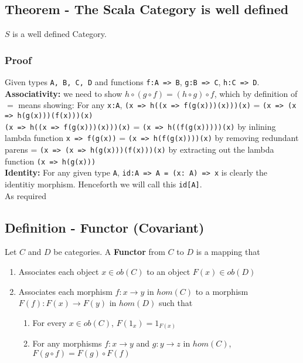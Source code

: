 \documentclass[9pt]{article} %
\begin{document}
\subsection{Theorem - The Scala Category is well defined}

$S$ is a well defined Category.

\subsubsection{Proof}

Given types \texttt{A, B, C, D} and functions \texttt{f:A => B}, \texttt{g:B => C}, \texttt{h:C => D}.\newline
\\
\noindent \textbf{Associativity:} we need to show $h \circ (g \circ f) = (h \circ g) \circ f$, which by definition of $=$ means showing:\newline
\noindent For any \texttt{x:A}, \newline
\texttt{(x => h((x => f(g(x)))(x)))(x)} = \texttt{(x => (x => h(g(x)))(f(x)))(x)}\newline
\\
\noindent \texttt{(x => h((x => f(g(x)))(x)))(x)} = \texttt{(x => h((f(g(x)))))(x)} by inlining lambda function \texttt{x => f(g(x))}\newline
= \texttt{(x => h(f(g(x))))(x)}  by removing redundant parens \newline
= \texttt{(x => (x => h(g(x)))(f(x)))(x)} by extracting out the lambda function \texttt{(x => h(g(x)))}\newline
\\
\noindent \textbf{Identity:} For any given type \texttt{A}, \texttt{id:A => A = (x: A) => x} is clearly the identitiy morphism.  Henceforth we will call this \texttt{id[A]}. \newline
\\
\noindent As required \blacksquare


\subsection{Definition - Functor (Covariant)}

Let $C$ and $D$ be categories. A \textbf{Functor} from $C$ to $D$ is a mapping that

\begin{enumerate}
    \item Associates each object $x \in ob(C)$ to an object $F(x) \in ob(D)$
    \item Associates each morphism $f: x \rightarrow y$ in $hom(C)$ to a morphism $F(f): F(x) \rightarrow F(y)$ in $hom(D)$ such that
    \begin{enumerate}
        \item For every $x \in ob(C)$, $F(1_x) = 1_{F(x)}$
        \item For any morphisms $f: x \rightarrow y$ and $g: y \rightarrow z$ in $hom(C)$, $F(g \circ f) = F(g) \circ F(f)$
    \end{enumerate}
\end{enumerate}
\end{document}

